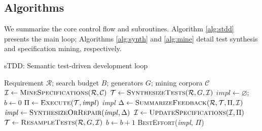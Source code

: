 \documentclass[10pt,twocolumn]{article}
\begin{document}
\subsection{Algorithms}
We summarize the core control flow and subroutines. Algorithm \ref{alg:stdd} presents the main loop; Algorithms \ref{alg:synth} and \ref{alg:mine} detail test synthesis and specification mining, respectively.

\vspace{0.5em}
\begin{algorithm}[ht]
\caption{sTDD: Semantic test-driven development loop}
\label{alg:stdd}
\small
\begin{algorithmic}[1]
\Require Requirement $\mathcal{R}$; search budget $B$; generators $G$; mining corpora $\mathcal{C}$
\State $\mathcal{I} \gets \textsc{MineSpecifications}(\mathcal{R}, \mathcal{C})$
\State $\mathcal{T} \gets \textsc{SynthesizeTests}(\mathcal{R}, G, \mathcal{I})$ 
\State $\mathit{impl} \gets \varnothing$; $b \gets 0$
  \State $\Pi \gets \textsc{Execute}(\mathcal{T}, \mathit{impl})$ 
     \State \Return \textit{impl}
  \EndIf
  \State $\Delta \gets \textsc{SummarizeFeedback}(\mathcal{R}, \mathcal{T}, \Pi, \mathcal{I})$ 
  \State $\mathit{impl} \gets \textsc{SynthesizeOrRepair}(\mathit{impl}, \Delta)$ 
  \State $\mathcal{I} \gets \textsc{UpdateSpecifications}(\mathcal{I}, \Pi)$ 
  \State $\mathcal{T} \gets \textsc{ResampleTests}(\mathcal{R}, G, \mathcal{I})$
  \State $b \gets b + 1$
\EndWhile
\State \Return \textsc{BestEffort}(\textit{impl}, $\Pi$)
\end{algorithmic}
\end{algorithm}
\vspace{0.5em}
\end{document}
